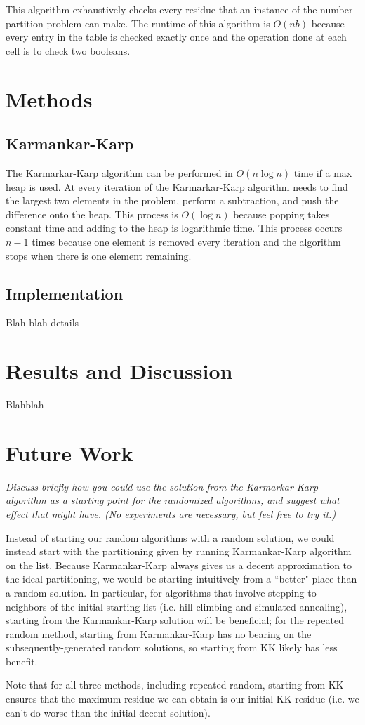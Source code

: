 \documentclass[a4paper]{article}
\begin{document}
	This algorithm exhaustively checks every residue that an instance of the number partition problem can make. The runtime of this algorithm is $O(nb)$ because every entry in the table is checked exactly once and the operation done at each cell is to check two booleans.
	
\section{Methods}
	\subsection{Karmankar-Karp}
	The Karmarkar-Karp algorithm can be performed in $O(n\log n)$ time if a max heap is used. At every iteration of the Karmarkar-Karp algorithm needs to find the largest two elements in the problem, perform a subtraction, and push the difference onto the heap. This process is $O(\log n)$ because popping takes constant time and adding to the heap is logarithmic time. This process occurs $n-1$ times because one element is removed every iteration and the algorithm stops when there is one element remaining.
	\subsection{Implementation}
	Blah blah details
	
\section{Results and Discussion}
	Blahblah

\section{Future Work}
	\textit{Discuss briefly how you could use the solution from the Karmarkar-Karp algorithm as a starting point for the randomized algorithms, and suggest what effect that might have. (No experiments are necessary, but feel free to try it.)}
	
	Instead of starting our random algorithms with a random solution, we could instead start with the partitioning given by running Karmankar-Karp algorithm on the list. Because Karmankar-Karp always gives us a decent approximation to the ideal partitioning, we would be starting intuitively from a ``better" place than a random solution. In particular, for algorithms that involve stepping to neighbors of the initial starting list (i.e. hill climbing and simulated annealing), starting from the Karmankar-Karp solution will be beneficial; for the repeated random method, starting from Karmankar-Karp has no bearing on the subsequently-generated random solutions, so starting from KK likely has less benefit.
	
	Note that for all three methods, including repeated random, starting from KK ensures that the maximum residue we can obtain is our initial KK residue (i.e. we can't do worse than the initial decent solution).
	
\end{document}
